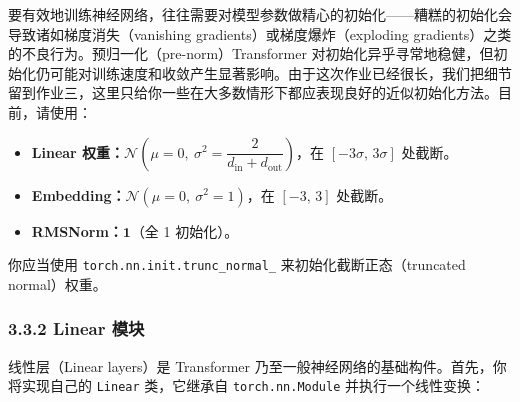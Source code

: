 要有效地训练神经网络，往往需要对模型参数做精心的初始化——糟糕的初始化会导致诸如梯度消失（vanishing gradients）或梯度爆炸（exploding gradients）之类的不良行为。预归一化（pre-norm）Transformer 对初始化异乎寻常地稳健，但初始化仍可能对训练速度和收敛产生显著影响。由于这次作业已经很长，我们把细节留到作业三，这里只给你一些在大多数情形下都应表现良好的近似初始化方法。目前，请使用：

\begin{itemize}
\item \textbf{Linear 权重：}$\mathcal{N}\!\left(\mu = 0,\ \sigma^2 = \dfrac{2}{d_{\mathrm{in}} + d_{\mathrm{out}}}\right)$，在 $[-3\sigma,\, 3\sigma]$ 处截断。
\item \textbf{Embedding：}$\mathcal{N}(\mu = 0,\ \sigma^2 = 1)$，在 $[-3,\, 3]$ 处截断。
\item \textbf{RMSNorm：}$\mathbf{1}$（全 1 初始化）。
\end{itemize}

你应当使用 \texttt{torch.nn.init.trunc\_normal\_} 来初始化截断正态（truncated normal）权重。

\subsubsection*{3.3.2 Linear 模块}

线性层（Linear layers）是 Transformer 乃至一般神经网络的基础构件。首先，你将实现自己的 \texttt{Linear} 类，它继承自 \texttt{torch.nn.Module} 并执行一个线性变换：
